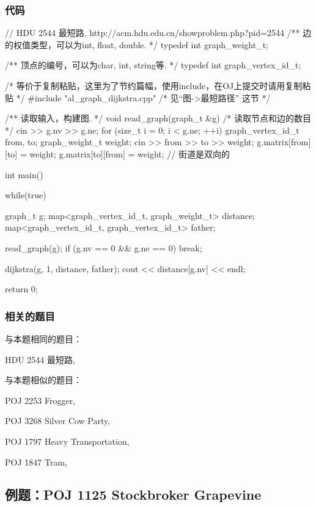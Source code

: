 \subsubsection{代码}
\begin{Codex}[label=hdu_2544.c]
// HDU 2544 最短路, http://acm.hdu.edu.cn/showproblem.php?pid=2544
/** 边的权值类型，可以为int, float, double. */
typedef int graph_weight_t;

/** 顶点的编号，可以为char, int, string等. */
typedef int graph_vertex_id_t;

/* 等价于复制粘贴，这里为了节约篇幅，使用include，在OJ上提交时请用复制粘贴 */
#include "al_graph_dijkstra.cpp"  /* 见“图->最短路径” 这节 */

/** 读取输入，构建图. */
void read_graph(graph_t &g) {
    /* 读取节点和边的数目 */
    cin >> g.nv >> g.ne;
    for (size_t i = 0; i < g.ne; ++i) {
        graph_vertex_id_t from, to;
        graph_weight_t weight;
        cin >> from >> to >> weight;
        g.matrix[from][to] = weight;
        g.matrix[to][from] = weight;  // 街道是双向的
    }
}


int main() {
    while(true) {
        graph_t g;
        map<graph_vertex_id_t, graph_weight_t> distance;
        map<graph_vertex_id_t, graph_vertex_id_t> father;

        read_graph(g);
        if (g.nv == 0 && g.ne == 0) break;

        dijkstra(g, 1, distance, father);
        cout << distance[g.nv] << endl;
    }

    return 0;
}
\end{Codex}

\subsubsection{相关的题目}
与本题相同的题目：
\begindot
\item HDU 2544 最短路, 
\myenddot

与本题相似的题目：
\begindot
\item POJ 2253 Frogger, 
\item POJ 3268 Silver Cow Party, 
\item POJ 1797 Heavy Transportation, 
\item POJ 1847 Tram, 
\myenddot


\subsection{例题：POJ 1125 Stockbroker Grapevine}
